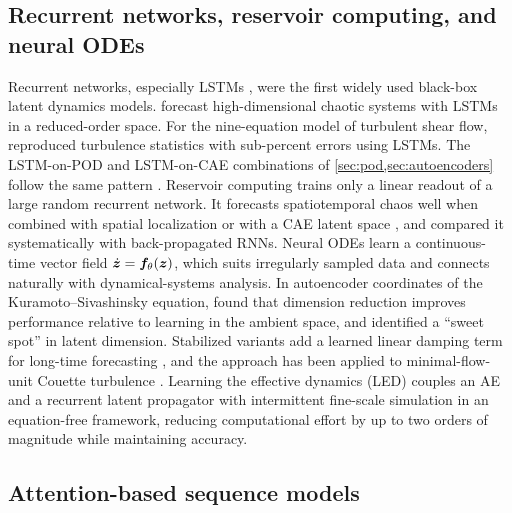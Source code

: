 \subsection{Recurrent networks, reservoir computing, and neural ODEs}

Recurrent networks, especially LSTMs \parencite{hochreiter1997lstm}, were the
first widely used black-box latent dynamics models.
\textcite{vlachas2018lstm} forecast high-dimensional chaotic systems with LSTMs
in a reduced-order space. For the nine-equation model of turbulent shear flow,
\textcite{srinivasan2019} reproduced turbulence statistics with sub-percent
errors using LSTMs. The LSTM-on-POD and LSTM-on-CAE combinations of
\cref{sec:pod,sec:autoencoders} follow the same pattern
\parencite{wang2018model,mohan2018lstm,eivazi2020deep,hasegawa2020bluff,maulik2021advection,borrelli2022channels}.
Reservoir computing trains only a linear readout of a large random recurrent
network. It forecasts spatiotemporal chaos well when combined with spatial
localization \parencite{pathak2018reservoir} or with a CAE latent space
\parencite{racca2023caesn}, and \textcite{vlachas2020backprop} compared it
systematically with back-propagated RNNs. Neural ODEs \parencite{chen2018node}
learn a continuous-time vector field $\dot{\bm{z}}=\bm{f}_{\theta}(\bm{z})$, which
suits irregularly sampled data and connects naturally with dynamical-systems
analysis. In autoencoder coordinates of the Kuramoto--Sivashinsky equation,
\textcite{linot2022node} found that dimension reduction improves performance
relative to learning in the ambient space, and identified a ``sweet spot''
in latent dimension. Stabilized variants add a learned linear damping term for
long-time forecasting \parencite{linot2023stabilized}, and the approach has been
applied to minimal-flow-unit Couette turbulence \parencite{linot2023couette}.
Learning the effective dynamics (LED) \parencite{vlachas2022led} couples an AE
and a recurrent latent propagator with intermittent fine-scale simulation in
an equation-free framework, reducing computational effort by up to two orders
of magnitude while maintaining accuracy.

\subsection{Attention-based sequence models}

